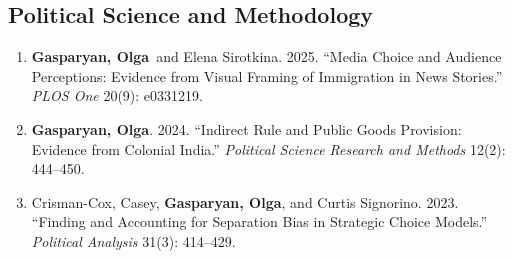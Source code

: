 \documentclass[10pt]{article}
\newcommand{\me}{\textbf{Gasparyan, Olga}}
\begin{document}
\subsection{Political Science and Methodology}
\begin{enumerate}
    \item \me\ and Elena Sirotkina. 2025. ``Media Choice and Audience Perceptions: Evidence from Visual Framing of Immigration in News Stories.'' \textit{PLOS One} 20(9): e0331219. 
    \item \me. 2024. ``Indirect Rule and Public Goods Provision: Evidence from Colonial India.'' \textit{Political Science Research and Methods} 12(2): 444--450.

    \item Crisman-Cox, Casey, \me, and Curtis Signorino. 2023. ``Finding and Accounting for Separation Bias in Strategic Choice Models.'' \textit{Political Analysis} 31(3): 414--429.
\end{enumerate}
\end{document}
